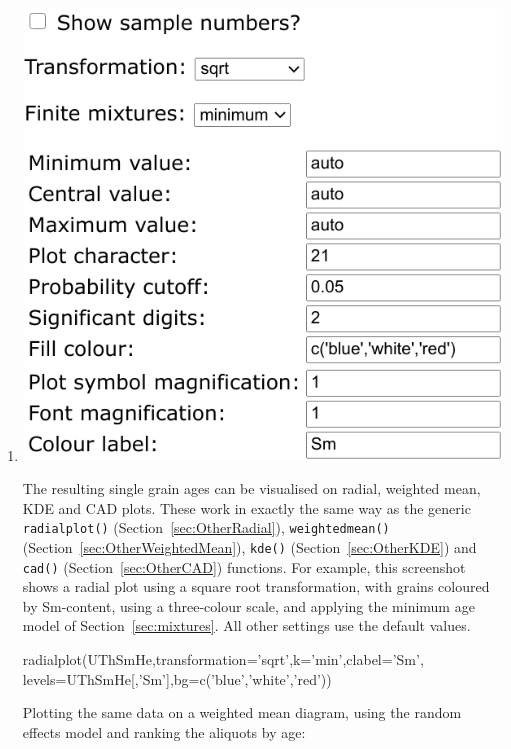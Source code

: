 \begin{refsection}
\begin{enumerate}
\item\noindent\begin{minipage}[t]{.5\linewidth}
\strut\vspace*{-\baselineskip}\newline
\includegraphics[width=\linewidth]{../figures/UThHeRadial.png}
\end{minipage}
\begin{minipage}[t]{.5\linewidth}
The resulting single grain ages can be visualised on radial, weighted
mean, KDE and CAD plots. These work in exactly the same way as the
generic \texttt{radialplot()} (Section~\ref{sec:OtherRadial}),
\texttt{weightedmean()} (Section~\ref{sec:OtherWeightedMean}),
\texttt{kde()} (Section~\ref{sec:OtherKDE}) and \texttt{cad()}
(Section~\ref{sec:OtherCAD}) functions. For example, this screenshot
shows a radial plot using a square root transformation, with grains
coloured by Sm-content, using a three-colour scale, and applying the
minimum age model of Section~\ref{sec:mixtures}. All other settings
use the default values.
\end{minipage}
  
\begin{script}
radialplot(UThSmHe,transformation='sqrt',k='min',clabel='Sm',
           levels=UThSmHe[,'Sm'],bg=c('blue','white','red'))
\end{script}

Plotting the same data on a weighted mean diagram, using the random
effects model and ranking the aliquots by age:


\end{enumerate}
\end{refsection}
